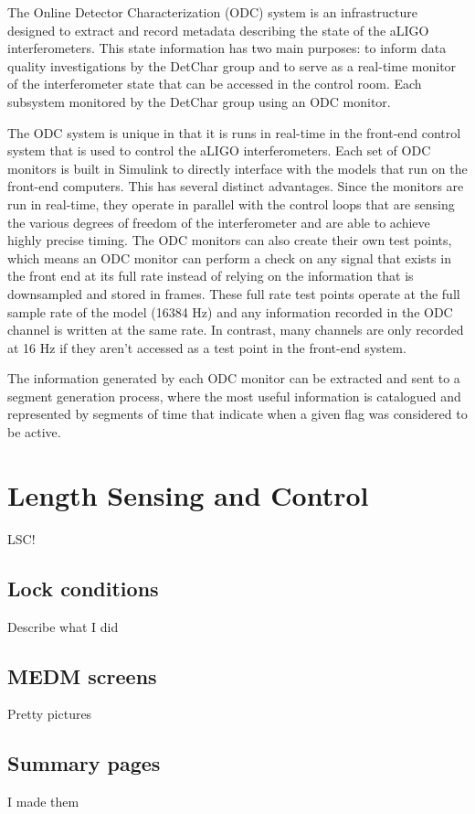 The Online Detector Characterization (ODC) system is an infrastructure designed to extract and record metadata describing the state of the aLIGO interferometers. This state information has two main purposes: to inform data quality investigations by the DetChar group and to serve as a real-time monitor of the interferometer state that can be accessed in the control room. Each subsystem monitored by the DetChar group using an ODC monitor.

The ODC system is unique in that it is runs in real-time in the front-end control system that is used to control the aLIGO interferometers. Each set of ODC monitors is built in Simulink to directly interface with the models that run on the front-end computers. This has several distinct advantages. 
Since the monitors are run in real-time, they operate in parallel with the control loops that are sensing the various degrees of freedom of the interferometer and are able to achieve highly precise timing. The ODC monitors can also create their own test points, which means an ODC monitor can perform a check on any signal that exists in the front end at its full rate instead of relying on the information that is downsampled and stored in frames. 
These full rate test points operate at the full sample rate of the model (16384 Hz) and any information recorded in the ODC channel is written at the same rate. In contrast, many channels are only recorded at 16 Hz if they aren't accessed as a test point in the front-end system. 

The information generated by each ODC monitor can be extracted and sent to a segment generation process, where the most useful information is catalogued and represented by segments of time that indicate when a given flag was considered to be active.  


\section{Length Sensing and Control}
LSC!

\subsection{Lock conditions}
Describe what I did

\subsection{MEDM screens}
Pretty pictures

\subsection{Summary pages}
I made them


